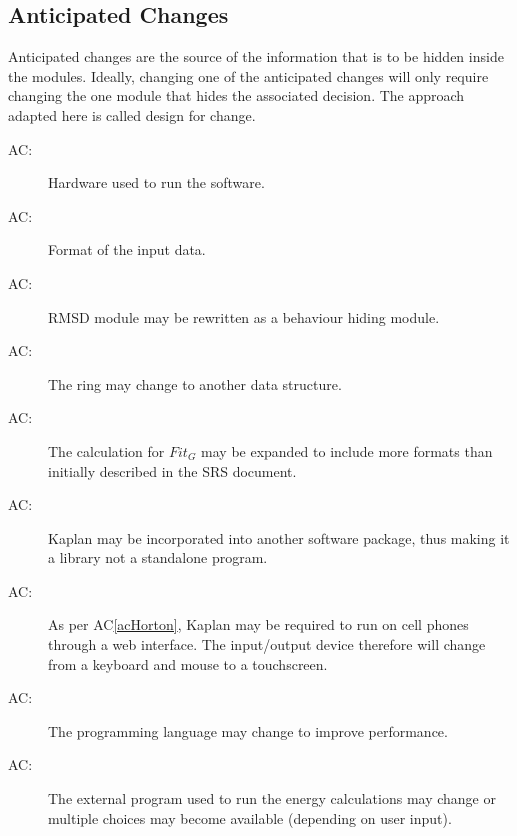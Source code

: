 \documentclass[12pt, titlepage]{article}
\newcounter{acnum}
\newcommand{\actheacnum}{AC\theacnum}
\newcommand{\progname}{Kaplan} %
\begin{document}
\subsection{Anticipated Changes} \label{SecAchange}

Anticipated changes are the source of the information that is to be hidden
inside the modules. Ideally, changing one of the anticipated changes will only
require changing the one module that hides the associated decision. The approach
adapted here is called design for
change.

\begin{description}
\item[ \actheacnum \label{acHardware}:] Hardware used to 
run the software.
\item[ \actheacnum \label{acInput}:] Format of the input 
data.
\item[ \actheacnum \label{acRMSD}:] RMSD module may be
  rewritten as a behaviour hiding module. 
\item[ \actheacnum \label{acRing}:] The ring may change 
to another data structure. 
\item[ \actheacnum \label{acFit_G}:] The calculation for 
$Fit_G$ may be expanded to include more formats than initially described in the 
SRS document.
\item[ \actheacnum \label{acHorton}:] \progname{} may be 
incorporated into another software package, thus making it a library not a 
standalone program. 
\item[ \actheacnum \label{acOutputDevice}:] As per 
AC\ref{acHorton}, \progname{} may be required to run on cell phones through a 
web 
interface. The input/output device therefore will change from a keyboard and 
mouse to a touchscreen.
\item[ \actheacnum \label{acProgLang}:] The programming 
language may change to improve performance. 
\item[ \actheacnum \label{acEnergy}:] The external 
program used to run the energy calculations may change or multiple choices may 
become available (depending on user input).
\end{description}
\end{document}
